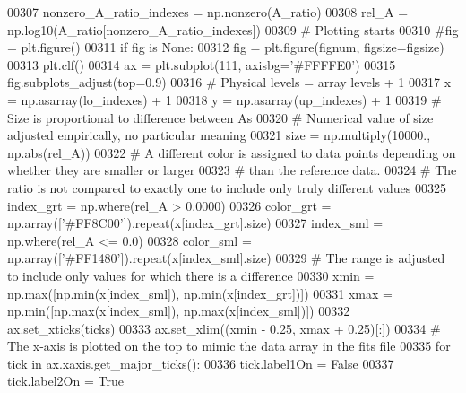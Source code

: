 \begin{DoxyCode}
00307                     nonzero\_A\_ratio\_indexes = np.nonzero(A\_ratio)
00308                     rel\_A = np.log10(A\_ratio[nonzero\_A\_ratio\_indexes])
00309                     \textcolor{comment}{# Plotting starts}
00310                     \textcolor{comment}{#fig = plt.figure()}
00311                     \textcolor{keywordflow}{if} fig \textcolor{keywordflow}{is} \textcolor{keywordtype}{None}:
00312                         fig = plt.figure(fignum, figsize=figsize)
00313                     plt.clf()
00314                     ax = plt.subplot(111, axisbg=\textcolor{stringliteral}{'#FFFFE0'})
00315                     fig.subplots\_adjust(top=0.9)
00316                     \textcolor{comment}{# Physical levels = array levels + 1}
00317                     x = np.asarray(lo\_indexes) + 1
00318                     y = np.asarray(up\_indexes) + 1
00319                     \textcolor{comment}{# Size is proportional to difference between As}
00320                     \textcolor{comment}{# Numerical value of size adjusted empirically, no particular meaning }
00321                     size = np.multiply(10000., np.abs(rel\_A))
00322                     \textcolor{comment}{# A different color is assigned to data points depending on whether they are smaller or
       larger}
00323                     \textcolor{comment}{# than the reference data.}
00324                     \textcolor{comment}{# The ratio is not compared to exactly one to include only truly different values  }
00325                     index\_grt = np.where(rel\_A > 0.0000)
00326                     color\_grt = np.array([\textcolor{stringliteral}{'#FF8C00'}]).repeat(x[index\_grt].size)
00327                     index\_sml = np.where(rel\_A <= 0.0)
00328                     color\_sml = np.array([\textcolor{stringliteral}{'#FF1480'}]).repeat(x[index\_sml].size)
00329                     \textcolor{comment}{# The range is adjusted to include only values for which there is a difference}
00330                     xmin = np.max([np.min(x[index\_sml]), np.min(x[index\_grt])])
00331                     xmax = np.min([np.max(x[index\_sml]), np.max(x[index\_sml])])
00332                     ax.set\_xticks(ticks)
00333                     ax.set\_xlim((xmin - 0.25, xmax + 0.25)[:])
00334                     \textcolor{comment}{# The x-axis is plotted on the top to mimic the data array in the fits file}
00335                     \textcolor{keywordflow}{for} tick \textcolor{keywordflow}{in} ax.xaxis.get\_major\_ticks():
00336                         tick.label1On = \textcolor{keyword}{False}
00337                         tick.label2On = \textcolor{keyword}{True}

\end{DoxyCode}
